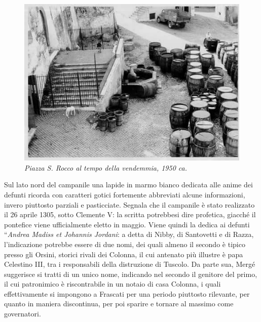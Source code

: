 \documentclass[
  letterpaper,
  DIV=11,
  numbers=noendperiod]{scrartcl}
\begin{document}
\begin{figure}[H]

{\centering \includegraphics{../../images/2024/san_rocco/7san-rocco-botti.jpg}

}

\caption{\emph{Piazza S. Rocco al tempo della vendemmia, 1950 ca.}}

\end{figure}%

Sul lato nord del campanile una lapide in marmo bianco dedicata alle
anime dei defunti ricorda con caratteri gotici fortemente abbreviati
alcune informazioni, invero piuttosto parziali e pasticciate. Segnala
che il campanile è stato realizzato il 26 aprile 1305, sotto Clemente V:
la scritta potrebbesi dire profetica, giacché il pontefice viene
ufficialmente eletto in maggio. Viene quindi la dedica ai defunti
``\emph{Andrea Madiss et Johannis Jordani}: a detta di Nibby, di
Santovetti e di Razza, l'indicazione potrebbe essere di due nomi, dei
quali almeno il secondo è tipico presso gli Orsini, storici rivali dei
Colonna, il cui antenato più illustre è papa Celestino III, tra i
responsabili della distruzione di Tuscolo. Da parte sua, Mergé
suggerisce si tratti di un unico nome, indicando nel secondo il genitore
del primo, il cui patronimico è riscontrabile in un notaio di casa
Colonna, i quali effettivamente si impongono a Frascati per una periodo
piuttosto rilevante, per quanto in maniera discontinua, per poi sparire
e tornare al massimo come governatori.
\end{document}
